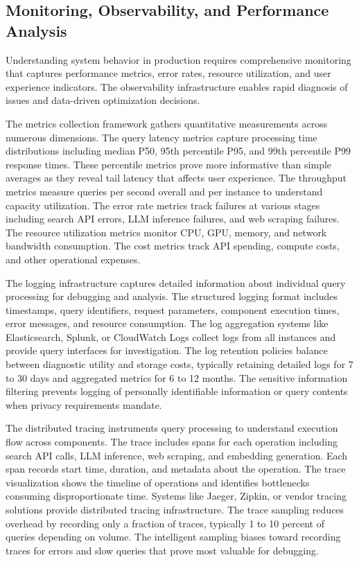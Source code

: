 \subsection{Monitoring, Observability, and Performance Analysis}

Understanding system behavior in production requires comprehensive monitoring that captures performance metrics, error rates, resource utilization, and user experience indicators. The observability infrastructure enables rapid diagnosis of issues and data-driven optimization decisions.

The metrics collection framework gathers quantitative measurements across numerous dimensions. The query latency metrics capture processing time distributions including median P50, 95th percentile P95, and 99th percentile P99 response times. These percentile metrics prove more informative than simple averages as they reveal tail latency that affects user experience. The throughput metrics measure queries per second overall and per instance to understand capacity utilization. The error rate metrics track failures at various stages including search API errors, LLM inference failures, and web scraping failures. The resource utilization metrics monitor CPU, GPU, memory, and network bandwidth consumption. The cost metrics track API spending, compute costs, and other operational expenses.

The logging infrastructure captures detailed information about individual query processing for debugging and analysis. The structured logging format includes timestamps, query identifiers, request parameters, component execution times, error messages, and resource consumption. The log aggregation systems like Elasticsearch, Splunk, or CloudWatch Logs collect logs from all instances and provide query interfaces for investigation. The log retention policies balance between diagnostic utility and storage costs, typically retaining detailed logs for 7 to 30 days and aggregated metrics for 6 to 12 months. The sensitive information filtering prevents logging of personally identifiable information or query contents when privacy requirements mandate.

The distributed tracing instruments query processing to understand execution flow across components. The trace includes spans for each operation including search API calls, LLM inference, web scraping, and embedding generation. Each span records start time, duration, and metadata about the operation. The trace visualization shows the timeline of operations and identifies bottlenecks consuming disproportionate time. Systems like Jaeger, Zipkin, or vendor tracing solutions provide distributed tracing infrastructure. The trace sampling reduces overhead by recording only a fraction of traces, typically 1 to 10 percent of queries depending on volume. The intelligent sampling biases toward recording traces for errors and slow queries that prove most valuable for debugging.

